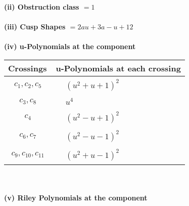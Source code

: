 \documentclass[1p]{elsarticle_modified}
\theoremstyle{definition}
\begin{document}
\flushleft \textbf{(ii) Obstruction class $= 1$}\\~\\
\flushleft \textbf{(iii) Cusp Shapes $= 2 a u+3 a- u+12$}\\~\\
\newpage\renewcommand{\arraystretch}{1}
\flushleft \textbf{(iv) u-Polynomials at the component}\newline \\
\begin{tabular}{m{50pt}|m{274pt}}
Crossings & \hspace{64pt}u-Polynomials at each crossing \\
\hline $$\begin{aligned}c_{1},c_{2},c_{5}\end{aligned}$$&$\begin{aligned}
&(u^2+u+1)^2
\end{aligned}$\\
\hline $$\begin{aligned}c_{3},c_{8}\end{aligned}$$&$\begin{aligned}
&u^4
\end{aligned}$\\
\hline $$\begin{aligned}c_{4}\end{aligned}$$&$\begin{aligned}
&(u^2- u+1)^2
\end{aligned}$\\
\hline $$\begin{aligned}c_{6},c_{7}\end{aligned}$$&$\begin{aligned}
&(u^2- u-1)^2
\end{aligned}$\\
\hline $$\begin{aligned}c_{9},c_{10},c_{11}\end{aligned}$$&$\begin{aligned}
&(u^2+u-1)^2
\end{aligned}$\\
\hline
\end{tabular}\\~\\
\newpage\renewcommand{\arraystretch}{1}
\flushleft \textbf{(v) Riley Polynomials at the component}\newline \\
\end{document}
